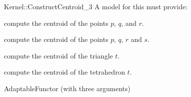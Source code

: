 \begin{ccRefFunctionObjectConcept}{Kernel::ConstructCentroid_3}
A model for this must provide:


 {compute the centroid of the points $p$, $q$, and $r$.}

 {compute the centroid of the points $p$, $q$, $r$ and $s$.}

 {compute the centroid of the triangle $t$.}

 {compute the centroid of the tetrahedron $t$.}

\ccRefines
AdaptableFunctor (with three arguments)

\ccSeeAlso
{} \\

\end{ccRefFunctionObjectConcept}
